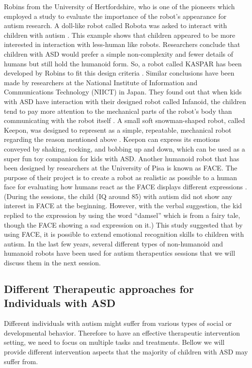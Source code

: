 Robins from the University of Hertfordshire, who is one of the pioneers which employed a study to 
evaluate the importance of the robot’s appearance for autism research. A doll-like robot called Robota 
was asked to interact with children with autism \cite{robins2005robotic}. This example shows that children appeared to 
be more interested in interaction with less-human like robots. Researchers conclude that children 
with ASD would prefer a simple non-complexity and fewer details of humans but still hold the humanoid 
form. So, a robot called KASPAR has been developed by Robins to fit this design criteria \cite{robins2006does}.
Similar conclusions have been made by researchers at the National Institute of Information and 
Communications Technology (NIICT) in Japan. They found out that when kids with ASD have interaction 
with their designed robot called Infanoid, the children tend to pay more attention to the mechanical 
parts of the robot’s body than communicating with the robot itself \cite{ricks2010trends}. A small soft snowman-shaped 
robot, called Keepon, was designed to represent as a simple, repeatable, mechanical robot regarding 
the reason mentioned above \cite{kozima2005interactive}. Keepon can express its emotions conveyed by shaking, rocking, and 
bobbing up and down, which can be used as a super fun toy companion for kids with ASD. Another humanoid 
robot that has been designed by researchers at the University of Pisa is known as FACE. The purpose 
of their project is to create a robot as realistic as possible to a human face for evaluating how humans 
react as the FACE displays different expressions \cite{pioggia2005android}. (During the sessions, the child (IQ around 85) with 
autism did not show any interest in FACE at the beginning. However, with the verbal suggestion, the kid replied 
to the expression by using the word “damsel” which is from a fairy tale, though the FACE showing a sad 
expression on it.) This study suggested that by using FACE, it is possible to extend emotional recognition 
skills to children with autism. In the last few years, several different types of non-humanoid and 
humanoid robots have been used for autism therapeutics sessions that we will discuss them in 
the next session.\\

\subsection{Different Therapeutic approaches for Individuals with ASD}
Different individuals with autism might suffer from various types of social 
or developmental behavior. Therefore to have an effective therapeutic intervention setting, we 
need to focus on multiple tasks and treatments. Bellow we will provide different intervention aspects 
that the majority of children with ASD may suffer from.\\

